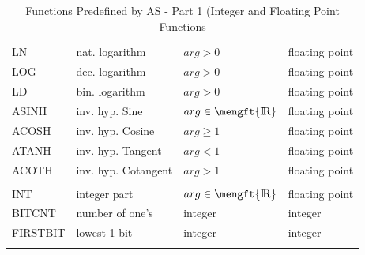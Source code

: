 \documentclass[12pt,twoside]{report}
\newcommand{\asname}{{AS}}
\def \rz{\hbox{\mengft{I \hskip -1.7mm R}}}
\begin{document}
\begin{center}
\begin{longtable}{|l|l|l|l|}
LN       & nat. logarithm       & $arg > 0$            & floating point \\
LOG      & dec. logarithm       & $arg > 0$            & floating point \\
LD       & bin. logarithm       & $arg > 0$            & floating point \\
ASINH    & inv. hyp. Sine       & $arg \in \rz$        & floating point \\
ACOSH    & inv. hyp. Cosine     & $arg \geq 1$         & floating point \\
ATANH    & inv. hyp. Tangent    & $arg < 1$            & floating point \\
ACOTH    & inv. hyp. Cotangent  & $arg > 1$            & floating point \\
         &                      &                      & \\
INT      & integer part         & $arg \in \rz$        & floating point \\
\hline
BITCNT   & number of one's      & integer              & integer \\
FIRSTBIT & lowest 1-bit         & integer              & integer \\
\hline
\caption{Functions Predefined by \asname{} - Part 1 (Integer and
         Floating Point Functions \label{TabFuncs1}}
\end{longtable}\end{center}
\end{document}
